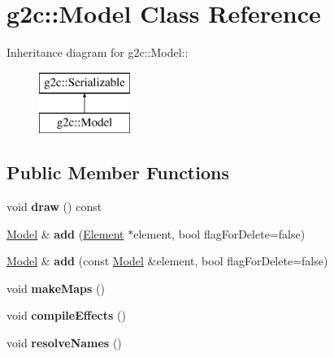 \hypertarget{classg2c_1_1_model}{
\section{g2c::Model Class Reference}
\label{classg2c_1_1_model}
}
Inheritance diagram for g2c::Model::\begin{figure}[H]
\begin{center}
\leavevmode
\includegraphics[height=2cm]{classg2c_1_1_model}
\end{center}
\end{figure}
\subsection*{Public Member Functions}
\begin{DoxyCompactItemize}
\item 
\hypertarget{classg2c_1_1_model_ad03aaa5728a9fdf16857b914c30e8424}{
void {\bfseries draw} () const }
\label{classg2c_1_1_model_ad03aaa5728a9fdf16857b914c30e8424}

\item 
\hypertarget{classg2c_1_1_model_a413d5a406612ebf4bc196f5830d33fa7}{
\hyperlink{classg2c_1_1_model}{Model} \& {\bfseries add} (\hyperlink{classg2c_1_1_element}{Element} $\ast$element, bool flagForDelete=false)}
\label{classg2c_1_1_model_a413d5a406612ebf4bc196f5830d33fa7}

\item 
\hypertarget{classg2c_1_1_model_a61713fda8fabb7417fb3907715a17819}{
\hyperlink{classg2c_1_1_model}{Model} \& {\bfseries add} (const \hyperlink{classg2c_1_1_model}{Model} \&element, bool flagForDelete=false)}
\label{classg2c_1_1_model_a61713fda8fabb7417fb3907715a17819}

\item 
\hypertarget{classg2c_1_1_model_a8a2dfbe528f8db727a16355645d0fef4}{
void {\bfseries makeMaps} ()}
\label{classg2c_1_1_model_a8a2dfbe528f8db727a16355645d0fef4}

\item 
\hypertarget{classg2c_1_1_model_a46e2e03ebb2b4c1f9beb0fd2286628be}{
void {\bfseries compileEffects} ()}
\label{classg2c_1_1_model_a46e2e03ebb2b4c1f9beb0fd2286628be}

\item 
\hypertarget{classg2c_1_1_model_af1a5e483a08dd2d25fc3f8f7aa27e178}{
void {\bfseries resolveNames} ()}
\label{classg2c_1_1_model_af1a5e483a08dd2d25fc3f8f7aa27e178}

\end{DoxyCompactItemize}
